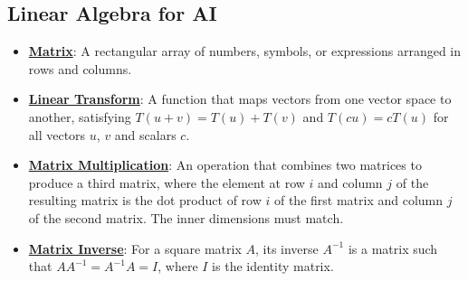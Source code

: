 \documentclass{article}%
\begin{document}
%
\subsection{Linear Algebra for AI}%
\label{subsec:LinearAlgebraforAI}%
\begin{itemize}[leftmargin=*]%
\item \href{\url{https://purdue.brightspace.com/d2l/common/assets/pdfjs-d2l-dist/1.0.14-legacy/web/viewer.html?file=\%252Fcontent\%252Fenforced\%252F1095467-wl.202510.CS.24300.001\%252F04L1-Linear\%20Algebra\%20Primer.pdf\%253Fou\%253D1095467\&lang=en-us\&container=d2l-fileviewer-rendered-pdf\&fullscreen=d2l-fileviewer-rendered-pdf-dialog\&height=667}#page=4}{\textbf{Matrix}}: A rectangular array of numbers, symbols, or expressions arranged in rows and columns.%
\item \href{\url{https://purdue.brightspace.com/d2l/common/assets/pdfjs-d2l-dist/1.0.14-legacy/web/viewer.html?file=\%252Fcontent\%252Fenforced\%252F1095467-wl.202510.CS.24300.001\%252F04L1-Linear\%20Algebra\%20Primer.pdf\%253Fou\%253D1095467\&lang=en-us\&container=d2l-fileviewer-rendered-pdf\&fullscreen=d2l-fileviewer-rendered-pdf-dialog\&height=667}#page=5}{\textbf{Linear Transform}}: A function that maps vectors from one vector space to another, satisfying $T(u + v) = T(u) + T(v)$ and $T(cu) = cT(u)$ for all vectors $u$, $v$ and scalars $c$.%
\item \href{\url{https://purdue.brightspace.com/d2l/common/assets/pdfjs-d2l-dist/1.0.14-legacy/web/viewer.html?file=\%252Fcontent\%252Fenforced\%252F1095467-wl.202510.CS.24300.001\%252F04L1-Linear\%20Algebra\%20Primer.pdf\%253Fou\%253D1095467\&lang=en-us\&container=d2l-fileviewer-rendered-pdf\&fullscreen=d2l-fileviewer-rendered-pdf-dialog\&height=667}#page=14}{\textbf{Matrix Multiplication}}: An operation that combines two matrices to produce a third matrix, where the element at row $i$ and column $j$ of the resulting matrix is the dot product of row $i$ of the first matrix and column $j$ of the second matrix. The inner dimensions must match.%
\item \href{\url{https://purdue.brightspace.com/d2l/common/assets/pdfjs-d2l-dist/1.0.14-legacy/web/viewer.html?file=\%252Fcontent\%252Fenforced\%252F1095467-wl.202510.CS.24300.001\%252F04L1-Linear\%20Algebra\%20Primer.pdf\%253Fou\%253D1095467\&lang=en-us\&container=d2l-fileviewer-rendered-pdf\&fullscreen=d2l-fileviewer-rendered-pdf-dialog\&height=667}#page=10}{\textbf{Matrix Inverse}}: For a square matrix $A$, its inverse $A^{-1}$ is a matrix such that $AA^{-1} = A^{-1}A = I$, where $I$ is the identity matrix.%

\end{itemize}
\end{document}
